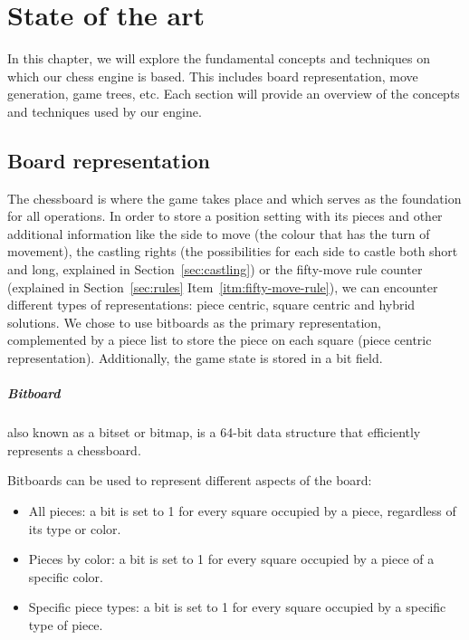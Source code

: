 \chapter{State of the art}
\label{cap:estadoDeLaCuestion}

In this chapter, we will explore the fundamental concepts and techniques on which our chess engine is based. This includes board representation, move generation, game trees, etc. Each section will provide an overview of the concepts and techniques used by our engine.

\section{Board representation}

The chessboard is where the game takes place and which serves as the foundation for all operations. In order to store a position setting with its pieces and other additional information like the side to move (the colour that has the turn of movement), the castling rights (the possibilities for each side to castle both short and long, explained in Section~\ref{sec:castling}) or the fifty-move rule counter (explained in Section~\ref{sec:rules} Item~\ref{itm:fifty-move-rule}), we can encounter different types of representations: piece centric, square centric and hybrid solutions. We chose to use bitboards as the primary representation, complemented by a piece list to store the piece on each square (piece centric representation). Additionally, the game state is stored in a bit field.

\paragraph{Bitboard} also known as a bitset or bitmap, is a 64-bit data structure that efficiently represents a chessboard.

\vspace{1em}

\noindent Bitboards can be used to represent different aspects of the board:

\begin{itemize}
    \item All pieces: a bit is set to 1 for every square occupied by a piece, regardless of its type or color.
    \item Pieces by color: a bit is set to 1 for every square occupied by a piece of a specific color. 
    \item Specific piece types: a bit is set to 1 for every square occupied by a specific type of piece.
\end{itemize}

